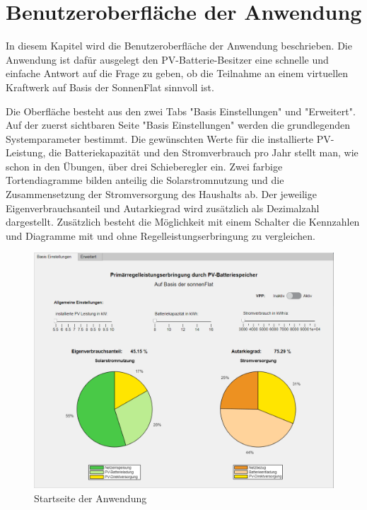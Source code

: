 \section{Benutzeroberfläche der Anwendung}
In diesem Kapitel wird die Benutzeroberfläche der Anwendung beschrieben. Die Anwendung ist dafür ausgelegt den PV-Batterie-Besitzer eine schnelle und einfache Antwort auf die Frage zu geben, ob die Teilnahme an einem virtuellen Kraftwerk auf Basis der SonnenFlat sinnvoll ist. \medskip

Die Oberfläche besteht aus den zwei Tabs "Basis Einstellungen" und "Erweitert". Auf der zuerst sichtbaren Seite "Basis Einstellungen" werden die grundlegenden Systemparameter bestimmt. Die gewünschten Werte für die installierte PV-Leistung, die Batteriekapazität und den Stromverbrauch pro Jahr stellt man, wie schon in den Übungen, über drei Schieberegler ein. Zwei farbige Tortendiagramme bilden anteilig die Solarstromnutzung und die Zusammensetzung der Stromversorgung des Haushalts ab. Der jeweilige Eigenverbrauchsanteil und Autarkiegrad wird zusätzlich als Dezimalzahl dargestellt. Zusätzlich besteht die Möglichkeit mit einem Schalter die Kennzahlen und Diagramme mit und ohne Regelleistungserbringung zu vergleichen. \\
\begin{figure}[H]
	\begin{center}
		\includegraphics[width=\textwidth]{Bilder/N_ScreenshotApp1.png}
		\caption{Startseite der Anwendung}
		\label{fig:app1}
	\end{center}
\end{figure}

